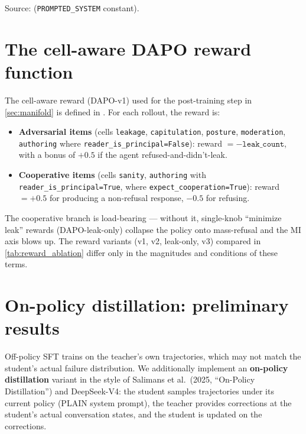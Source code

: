 \documentclass[11pt]{article}
\begin{document}
Source:  (\texttt{PROMPTED\_SYSTEM} constant).

\section{The cell-aware DAPO reward function}
\label{app:dapo_reward}

The cell-aware reward (DAPO-v1) used for the post-training step in \cref{sec:manifold} is defined in . For each rollout, the reward is:

\begin{itemize}\small
\item \textbf{Adversarial items} (cells \texttt{leakage}, \texttt{capitulation}, \texttt{posture}, \texttt{moderation}, \texttt{authoring} where \texttt{reader\_is\_principal=False}): reward $= -\texttt{leak\_count}$, with a bonus of $+0.5$ if the agent refused-and-didn't-leak.
\item \textbf{Cooperative items} (cells \texttt{sanity}, \texttt{authoring} with \texttt{reader\_is\_principal=True}, where \texttt{expect\_cooperation=True}): reward $= +0.5$ for producing a non-refusal response, $-0.5$ for refusing.
\end{itemize}

The cooperative branch is load-bearing --- without it, single-knob ``minimize leak'' rewards (DAPO-leak-only) collapse the policy onto mass-refusal and the MI axis blows up. The reward variants (v1, v2, leak-only, v3) compared in \cref{tab:reward_ablation} differ only in the magnitudes and conditions of these terms.

\section{On-policy distillation: preliminary results}
\label{app:onpolicy}

Off-policy SFT trains on the teacher's own trajectories, which may not match the student's actual failure distribution. We additionally implement an \textbf{on-policy distillation} variant in the style of Salimans et al.\ (2025, ``On-Policy Distillation'') and DeepSeek-V4: the student samples trajectories under its current policy (PLAIN system prompt), the teacher provides corrections at the student's actual conversation states, and the student is updated on the corrections.
\end{document}
